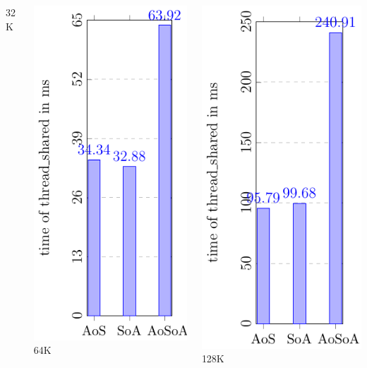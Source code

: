 \documentclass[aspectratio=169]{beamer}
\begin{document}
\begin{frame}
\begin{columns}
\begin{column}{0.25\textwidth}
	\small 32K
	\end{column}
	\begin{column}{0.25\textwidth}
	\includegraphics[scale=0.55]{figures/fig3000.pdf}
	\small 64K
	\end{column}
	\begin{column}{0.25\textwidth}
	\includegraphics[scale=0.55]{figures/fig4000.pdf}
	\small 128K
	\end{column}	
	\end{columns}
	

\end{frame}
\end{document}
